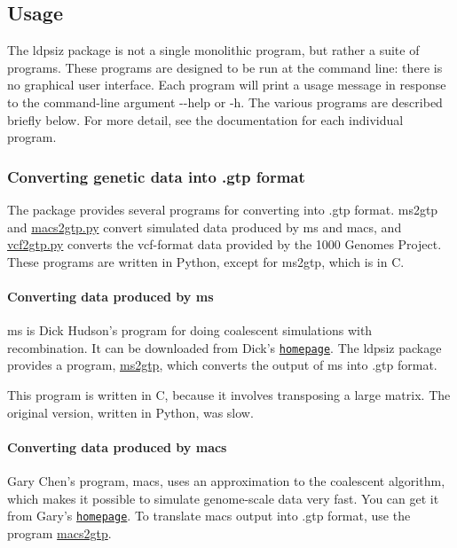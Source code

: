 \subsection*{Usage}

The {\ttfamily ldpsiz} package is not a single monolithic program, but rather a suite of programs. These programs are designed to be run at the command line\+: there is no graphical user interface. Each program will print a usage message in response to the command-\/line argument {\ttfamily -\/-\/help} or {\ttfamily -\/h}. The various programs are described briefly below. For more detail, see the documentation for each individual program.

\subsubsection*{Converting genetic data into .gtp format}

The package provides several programs for converting into .gtp format. {\ttfamily ms2gtp} and {\ttfamily \hyperlink{macs2gtp_8py}{macs2gtp.\+py}} convert simulated data produced by {\ttfamily ms} and {\ttfamily macs}, and {\ttfamily \hyperlink{vcf2gtp_8py}{vcf2gtp.\+py}} converts the vcf-\/format data provided by the 1000 Genomes Project. These programs are written in Python, except for {\ttfamily ms2gtp}, which is in C.

\paragraph*{Converting data produced by {\ttfamily ms}}

{\ttfamily ms} is Dick Hudson's program for doing coalescent simulations with recombination. It can be downloaded from Dick's \href{http://home.uchicago.edu/rhudson1/source.html}{\tt homepage}. The {\ttfamily ldpsiz} package provides a program, \hyperlink{ms2gtp_8c_ms2gtp}{ms2gtp}, which converts the output of {\ttfamily ms} into .gtp format.

This program is written in C, because it involves transposing a large matrix. The original version, written in Python, was slow.

\paragraph*{Converting data produced by {\ttfamily macs}}

Gary Chen's program, {\ttfamily macs}, uses an approximation to the coalescent algorithm, which makes it possible to simulate genome-\/scale data very fast. You can get it from Gary's \href{http://www-hsc.usc.edu/~garykche}{\tt homepage}. To translate {\ttfamily macs} output into .gtp format, use the program \hyperlink{macs2gtp_8py_macs2gtp}{macs2gtp}.


